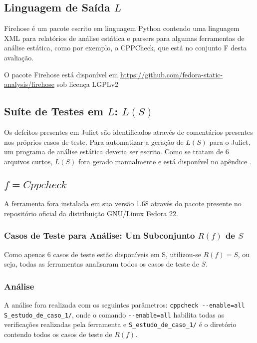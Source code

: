 \subsection{Linguagem de Saída $L$}

Firehose é um pacote escrito em linguagem Python contendo uma linguagem XML para relatórios de análise estática e parsers para algumas ferramentas de análise estática, como por exemplo, o CPPCheck, que está no conjunto F desta avaliação.

O pacote Firehose está disponível em \url{https://github.com/fedora-static-analysis/firehose} sob licença LGPLv2

\subsection{Suíte de Testes em $L$: $L(S)$}

Os defeitos presentes em Juliet são identificados através de comentários presentes nos próprios casos de teste. Para automatizar a geração de $L(S)$ para o Juliet, um programa de análise estática deveria ser escrito. Como se tratam de 6 arquivos curtos, $L(S)$ fora gerado manualmente e está disponível no apêndice .

\subsection{$f = Cppcheck$}

A ferramenta fora instalada em sua versão 1.68 através do pacote presente no repositório oficial da distribuição GNU/Linux Fedora 22.

\subsubsection{Casos de Teste para Análise: Um Subconjunto $R(f)$ de $S$}

Como apenas 6 casos de teste estão disponíveis em S, utilizou-se $R(f) = S$, ou seja, todas as ferramentas analisaram todos os casos de teste de $S$.

\subsubsection{Análise}

A análise fora realizada com os seguintes parâmetros:
\lstinline{cppcheck --enable=all S_estudo_de_caso_1/},
onde o comando \lstinline{--enable=all} habilita todas as verificações realizadas pela ferramenta e \lstinline{S_estudo_de_caso_1/} é o diretório contendo todos os casos de teste de $R(f)$.

